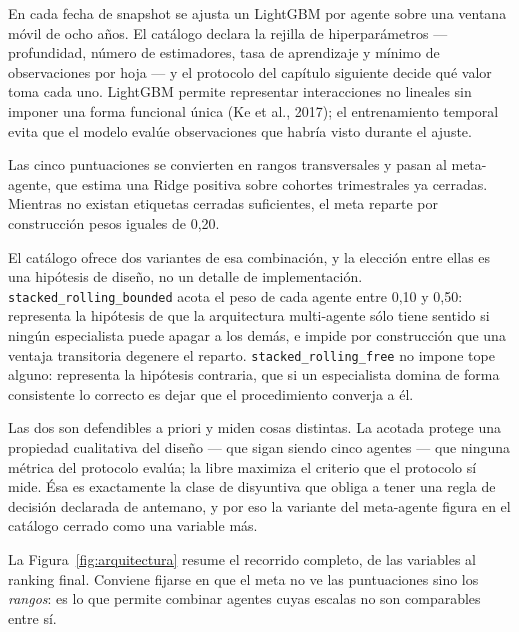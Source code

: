 En cada fecha de snapshot se ajusta un LightGBM por agente sobre una ventana móvil de ocho años. El
catálogo declara la rejilla de hiperparámetros --- profundidad, número de estimadores, tasa de
aprendizaje y mínimo de observaciones por hoja --- y el protocolo del capítulo siguiente decide qué
valor toma cada uno. LightGBM permite representar interacciones no lineales sin imponer una forma
funcional única (Ke et al., 2017); el entrenamiento temporal evita que el modelo evalúe
observaciones que habría visto durante el ajuste.

Las cinco puntuaciones se convierten en rangos transversales y pasan al meta-agente, que estima una
Ridge positiva sobre cohortes trimestrales ya cerradas. Mientras no existan etiquetas cerradas
suficientes, el meta reparte por construcción pesos iguales de 0,20.

El catálogo ofrece dos variantes de esa combinación, y la elección entre ellas es una hipótesis de
diseño, no un detalle de implementación. \texttt{stacked\_rolling\_bounded} acota el peso de cada
agente entre 0,10 y 0,50: representa la hipótesis de que la arquitectura multi-agente sólo tiene
sentido si ningún especialista puede apagar a los demás, e impide por construcción que una ventaja
transitoria degenere el reparto. \texttt{stacked\_rolling\_free} no impone tope alguno: representa
la hipótesis contraria, que si un especialista domina de forma consistente lo correcto es dejar que
el procedimiento converja a él.

Las dos son defendibles a priori y miden cosas distintas. La acotada protege una propiedad
cualitativa del diseño --- que sigan siendo cinco agentes --- que ninguna métrica del protocolo
evalúa; la libre maximiza el criterio que el protocolo sí mide. Ésa es exactamente la clase de
disyuntiva que obliga a tener una regla de decisión declarada de antemano, y por eso la variante del
meta-agente figura en el catálogo cerrado como una variable más.

La Figura~\ref{fig:arquitectura} resume el recorrido completo, de las variables al ranking final.
Conviene fijarse en que el meta no ve las puntuaciones sino los \emph{rangos}: es lo que permite
combinar agentes cuyas escalas no son comparables entre sí.

